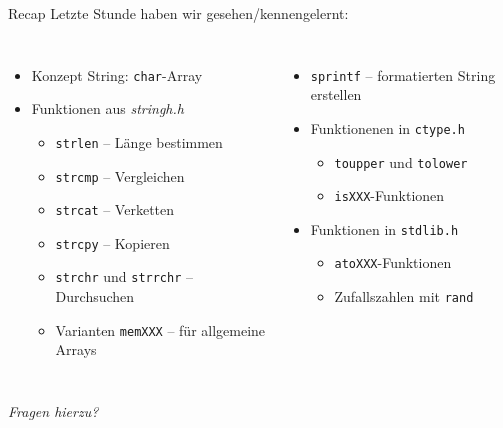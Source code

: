 
\begin{frame}[t,plain]
\titlepage
\end{frame}


\begin{frame}{Recap}
%
Letzte Stunde haben wir gesehen/kennengelernt:
%
\begin{columns}[T]
\begin{itemize}
\item Konzept String: \texttt{char}-Array
\item Funktionen aus \emph{stringh.h}
	\begin{itemize}
	\item \texttt{strlen} -- Länge bestimmen
	\item \texttt{strcmp} -- Vergleichen
	\item \texttt{strcat} -- Verketten
	\item \texttt{strcpy} -- Kopieren
	\item \texttt{strchr} und \texttt{strrchr} -- Durchsuchen
	\item Varianten \texttt{memXXX} -- für allgemeine Arrays
	\end{itemize}
\end{itemize}
%
\begin{itemize}
\item \texttt{sprintf} -- formatierten String erstellen
\item Funktionenen in \texttt{ctype.h}
	\begin{itemize}
	\item \texttt{toupper} und \texttt{tolower}
	\item \texttt{isXXX}-Funktionen
	\end{itemize}
\item Funktionen in \texttt{stdlib.h}
	\begin{itemize}
	\item \texttt{atoXXX}-Funktionen
	\item Zufallszahlen mit \texttt{rand}
	\end{itemize}
\end{itemize}
\end{columns}
\begin{center}
\emph{Fragen hierzu?}
\end{center}
%
\end{frame}

